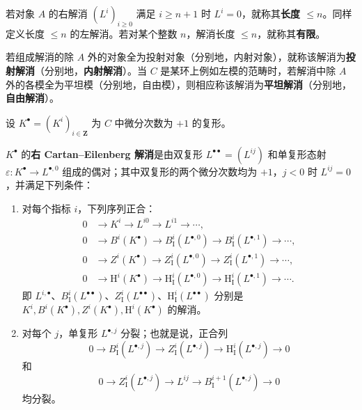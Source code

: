 若对象 $A$ 的右解消 $(L^i)_{i\geq0}$ 满足 $i\geq n+1$ 时 $L^i=0$，就称其\textbf{长度 $\leq n$}。同样定义长度 $\leq n$ 的左解消。若对某个整数 $n$，解消长度 $\leq n$，就称其\textbf{有限}。

若组成解消的除 $A$ 外的对象全为投射对象（分别地，内射对象），就称该解消为\textbf{投射解消}（分别地，\textbf{内射解消}）。当 $C$ 是某环上例如左模的范畴时，若解消中除 $A$ 外的各模全为平坦模（分别地，自由模），则相应称该解消为\textbf{平坦解消}（分别地，\textbf{自由解消}）。

设 $K^\bullet=(K^i)_{i\in\mathbf Z}$ 为 $C$ 中微分次数为 $+1$ 的复形。

$K^\bullet$ 的\textbf{右 Cartan--Eilenberg 解消}是由双复形 $L^{\bullet\bullet}=(L^{ij})$ 和单复形态射 $\varepsilon:K^\bullet\to L^{\bullet,0}$ 组成的偶对；其中双复形的两个微分次数均为 $+1$，$j<0$ 时 $L^{ij}=0$，并满足下列条件：
\begin{enumerate}[label=(\roman*)]
\item 对每个指标 $i$，下列序列正合：
\[
\begin{aligned}
0&\longrightarrow K^i\longrightarrow L^{i0}\longrightarrow L^{i1}\longrightarrow\cdots,\\
0&\longrightarrow B^i(K^\bullet)\longrightarrow B_{\mathrm I}^i(L^{\bullet,0})\longrightarrow B_{\mathrm I}^i(L^{\bullet,1})\longrightarrow\cdots,\\
0&\longrightarrow Z^i(K^\bullet)\longrightarrow Z_{\mathrm I}^i(L^{\bullet,0})\longrightarrow Z_{\mathrm I}^i(L^{\bullet,1})\longrightarrow\cdots,\\
0&\longrightarrow\mathrm H^i(K^\bullet)\longrightarrow\mathrm H_{\mathrm I}^i(L^{\bullet,0})\longrightarrow\mathrm H_{\mathrm I}^i(L^{\bullet,1})\longrightarrow\cdots.
\end{aligned}
\]
即 $L^{i,\bullet}$、$B_{\mathrm I}^i(L^{\bullet\bullet})$、$Z_{\mathrm I}^i(L^{\bullet\bullet})$、$\mathrm H_{\mathrm I}^i(L^{\bullet\bullet})$ 分别是 $K^i,B^i(K^\bullet),Z^i(K^\bullet),\mathrm H^i(K^\bullet)$ 的解消。
\item 对每个 $j$，单复形 $L^{\bullet,j}$ 分裂；也就是说，正合列
\begin{equation}\tag{11.4.2.1}
0\longrightarrow B_{\mathrm I}^i(L^{\bullet,j})\longrightarrow Z_{\mathrm I}^i(L^{\bullet,j})\longrightarrow\mathrm H_{\mathrm I}^i(L^{\bullet,j})\longrightarrow0
\end{equation}
和
\begin{equation}\tag{11.4.2.2}
0\longrightarrow Z_{\mathrm I}^i(L^{\bullet,j})\longrightarrow L^{ij}\longrightarrow B_{\mathrm I}^{i+1}(L^{\bullet,j})\longrightarrow0
\end{equation}
均分裂。
\end{enumerate}
